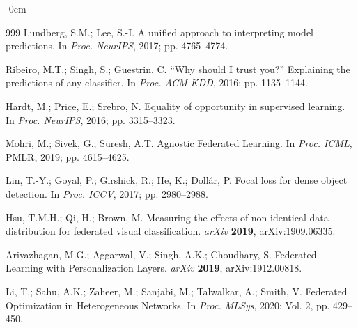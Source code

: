 \documentclass[journal,article,submit,pdftex,moreauthors]{Definitions/mdpi}
\begin{document}
\begin{adjustwidth}{-\extralength}{0cm}
\begin{thebibliography}{999}
Lundberg, S.M.; Lee, S.-I. A unified approach to interpreting model predictions. In \textit{Proc. NeurIPS}, 2017; pp. 4765--4774.

Ribeiro, M.T.; Singh, S.; Guestrin, C. ``Why should I trust you?'' Explaining the predictions of any classifier. In \textit{Proc. ACM KDD}, 2016; pp. 1135--1144.

Hardt, M.; Price, E.; Srebro, N. Equality of opportunity in supervised learning. In \textit{Proc. NeurIPS}, 2016; pp. 3315--3323.

Mohri, M.; Sivek, G.; Suresh, A.T. Agnostic Federated Learning. In \textit{Proc. ICML}, PMLR, 2019; pp. 4615--4625.

Lin, T.-Y.; Goyal, P.; Girshick, R.; He, K.; Doll\'ar, P. Focal loss for dense object detection. In \textit{Proc. ICCV}, 2017; pp. 2980--2988.

Hsu, T.M.H.; Qi, H.; Brown, M. Measuring the effects of non-identical data distribution for federated visual classification. \textit{arXiv} \textbf{2019}, arXiv:1909.06335.

Arivazhagan, M.G.; Aggarwal, V.; Singh, A.K.; Choudhary, S. Federated Learning with Personalization Layers. \textit{arXiv} \textbf{2019}, arXiv:1912.00818.

Li, T.; Sahu, A.K.; Zaheer, M.; Sanjabi, M.; Talwalkar, A.; Smith, V. Federated Optimization in Heterogeneous Networks. In \textit{Proc. MLSys}, 2020; Vol. 2, pp. 429--450.

\end{thebibliography}

\end{adjustwidth}

\PublishersNote{}
\end{document}
